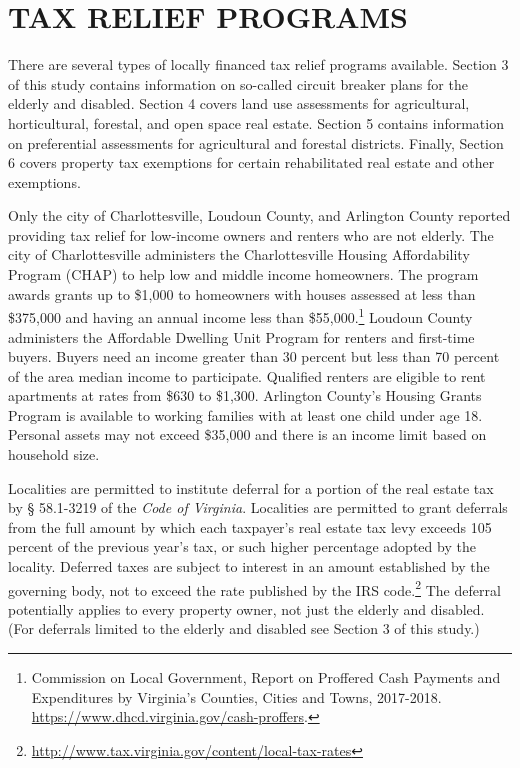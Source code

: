 \documentclass[
]{book}
\begin{document}
\hypertarget{tax-relief-programs}{%
\section{TAX RELIEF PROGRAMS}\label{tax-relief-programs}}

There are several types of locally financed tax relief programs available. Section 3 of this study contains information on so-called circuit breaker plans for the elderly and disabled. Section 4 covers land use assessments for agricultural, horticultural, forestal, and open space real estate. Section 5 contains information on preferential assessments for agricultural and forestal districts. Finally, Section 6 covers property tax exemptions for certain rehabilitated real estate and other exemptions.

Only the city of Charlottesville, Loudoun County, and Arlington County reported providing tax relief for low-income owners and renters who are not elderly. The city of Charlottesville administers the Charlottesville Housing Affordability Program (CHAP) to help low and middle income homeowners. The program awards grants up to \$1,000 to homeowners with houses assessed at less than \$375,000 and having an annual income less than \$55,000.\footnote{Commission on Local Government, Report on Proffered Cash Payments and Expenditures by Virginia's Counties, Cities and Towns, 2017-2018. \url{https://www.dhcd.virginia.gov/cash-proffers}.} Loudoun County administers the Affordable Dwelling Unit Program for renters and first-time buyers. Buyers need an income greater than 30 percent but less than 70 percent of the area median income to participate. Qualified renters are eligible to rent apartments at rates from \$630 to \$1,300. Arlington County's Housing Grants Program is available to working families with at least one child under age 18. Personal assets may not exceed \$35,000 and there is an income limit based on household size.

Localities are permitted to institute deferral for a portion of the real estate tax by § 58.1-3219 of the \emph{Code of Virginia}. Localities are permitted to grant deferrals from the full amount by which each taxpayer's real estate tax levy exceeds 105 percent of the previous year's tax, or such higher percentage adopted by the locality. Deferred taxes are subject to interest in an amount established by the governing body, not to exceed the rate published by the IRS code.\footnote{\url{http://www.tax.virginia.gov/content/local-tax-rates}} The deferral potentially applies to every property owner, not just the elderly and disabled. (For deferrals limited to the elderly and disabled see Section 3 of this study.)
\end{document}
